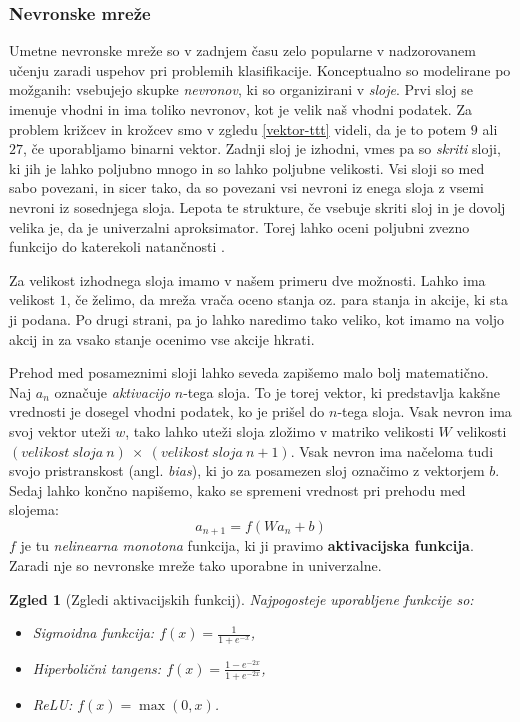 \documentclass[12pt,a4paper]{amsart}
\theoremstyle{definition} %
\theoremstyle{plain} %
\newtheorem{zgled}[definicija]{Zgled}
\begin{document}
\subsubsection{Nevronske mreže}
Umetne nevronske mreže so v zadnjem času zelo popularne v nadzorovanem učenju zaradi uspehov pri 
problemih klasifikacije. Konceptualno so modelirane po možganih: vsebujejo skupke \textit{nevronov}, 
ki so organizirani v \textit{sloje}. Prvi sloj se imenuje vhodni in ima toliko nevronov, kot je velik 
naš vhodni podatek. Za problem križcev in krožcev smo v zgledu \ref{vektor-ttt} videli, da je to potem 
$9$ ali $27$, če uporabljamo binarni vektor. Zadnji sloj je izhodni, vmes pa so \textit{skriti} sloji, 
ki jih je lahko poljubno mnogo in so lahko poljubne velikosti. Vsi sloji so med sabo povezani, in sicer 
tako, da so povezani vsi nevroni iz enega sloja z vsemi nevroni iz sosednjega sloja. Lepota te strukture, 
če vsebuje skriti sloj in je dovolj velika je, da je univerzalni aproksimator. Torej lahko oceni 
poljubni zvezno funkcijo do katerekoli natančnosti \cite{NN}.

Za velikost izhodnega sloja imamo v našem primeru dve možnosti. Lahko ima velikost $1$, če želimo, 
da mreža vrača oceno stanja oz. para stanja in akcije, ki sta ji podana. Po drugi strani, pa jo lahko 
naredimo tako veliko, kot imamo na voljo akcij in za vsako stanje ocenimo vse akcije hkrati. 

Prehod med posameznimi sloji lahko seveda zapišemo malo bolj matematično. Naj $a_n$ označuje 
\textit{aktivacijo} $n$-tega sloja. To je torej vektor, ki predstavlja kakšne vrednosti je dosegel
vhodni podatek, ko je prišel do $n$-tega sloja. Vsak nevron ima svoj vektor uteži $w$, tako lahko 
uteži sloja zložimo v matriko velikosti $W$ velikosti $(velikost~sloja~n)~\times~(velikost~sloja~n + 1)$.
Vsak nevron ima načeloma tudi svojo pristranskost (angl. \textit{bias}), ki jo za posamezen sloj 
označimo z vektorjem $b$. Sedaj lahko končno napišemo, kako se spremeni vrednost pri prehodu med 
slojema:
$$
a_{n+1} = f(W a_n + b)
$$
$f$ je tu \textit{nelinearna monotona} funkcija, ki ji pravimo \textbf{aktivacijska funkcija}. Zaradi 
nje so nevronske mreže tako uporabne in univerzalne. 

\begin{zgled}[Zgledi aktivacijskih funkcij]
    Najpogosteje uporabljene funkcije so:
    \begin{itemize}
        \item Sigmoidna funkcija: $f(x) = \frac{1}{1 + e^{-x}}$, 
        \item Hiperbolični tangens: $f(x) = \frac{1 - e^{-2x}}{1 + e^{-2x}}$,
        \item ReLU: $f(x) = \max(0, x)$.
    \end{itemize}
\end{zgled}
\end{document}
